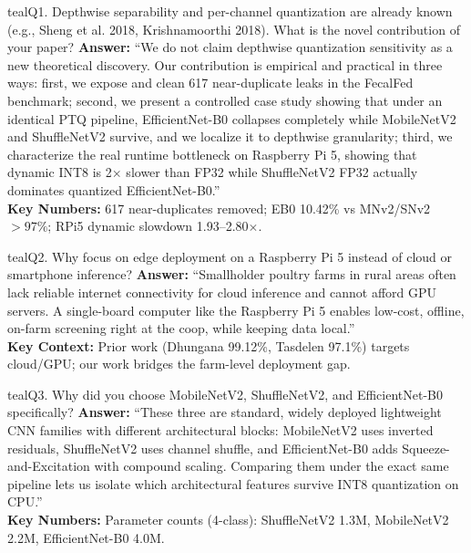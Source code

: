 \documentclass[10pt,a4paper]{article}
\begin{document}
\begin{qabox}{teal}{Q1. Depthwise separability and per-channel quantization are already known (e.g., Sheng et al. 2018, Krishnamoorthi 2018). What is the novel contribution of your paper?}
\textbf{Answer:}
``We do not claim depthwise quantization sensitivity as a new theoretical discovery. Our contribution is empirical and practical in three ways: first, we expose and clean 617 near-duplicate leaks in the FecalFed benchmark; second, we present a controlled case study showing that under an identical PTQ pipeline, EfficientNet-B0 collapses completely while MobileNetV2 and ShuffleNetV2 survive, and we localize it to depthwise granularity; third, we characterize the real runtime bottleneck on Raspberry Pi 5, showing that dynamic INT8 is 2$\times$ slower than FP32 while ShuffleNetV2 FP32 actually dominates quantized EfficientNet-B0.''\\[3pt]
\textbf{Key Numbers:} 617 near-duplicates removed; EB0 10.42\% vs MNv2/SNv2 $>97\%$; RPi5 dynamic slowdown 1.93--2.80$\times$.
\end{qabox}

\begin{qabox}{teal}{Q2. Why focus on edge deployment on a Raspberry Pi 5 instead of cloud or smartphone inference?}
\textbf{Answer:}
``Smallholder poultry farms in rural areas often lack reliable internet connectivity for cloud inference and cannot afford GPU servers. A single-board computer like the Raspberry Pi 5 enables low-cost, offline, on-farm screening right at the coop, while keeping data local.''\\[3pt]
\textbf{Key Context:} Prior work (Dhungana 99.12\%, Tasdelen 97.1\%) targets cloud/GPU; our work bridges the farm-level deployment gap.
\end{qabox}

\begin{qabox}{teal}{Q3. Why did you choose MobileNetV2, ShuffleNetV2, and EfficientNet-B0 specifically?}
\textbf{Answer:}
``These three are standard, widely deployed lightweight CNN families with different architectural blocks: MobileNetV2 uses inverted residuals, ShuffleNetV2 uses channel shuffle, and EfficientNet-B0 adds Squeeze-and-Excitation with compound scaling. Comparing them under the exact same pipeline lets us isolate which architectural features survive INT8 quantization on CPU.''\\[3pt]
\textbf{Key Numbers:} Parameter counts (4-class): ShuffleNetV2 1.3M, MobileNetV2 2.2M, EfficientNet-B0 4.0M.
\end{qabox}
\end{document}
